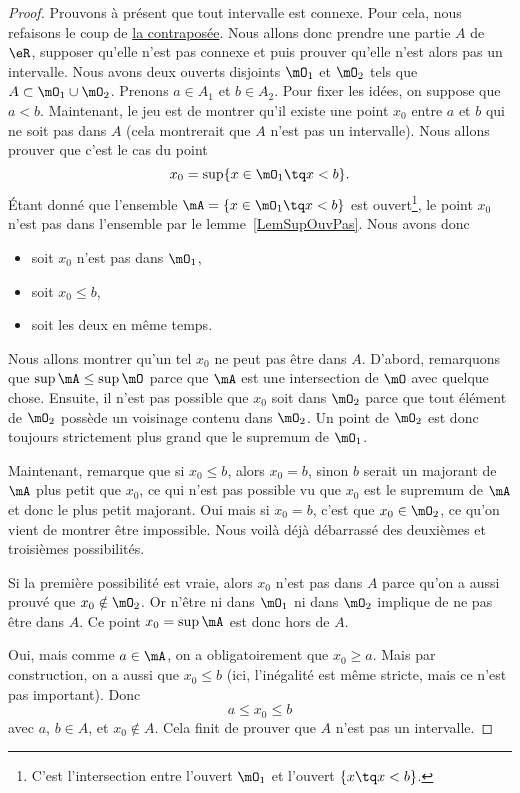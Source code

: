 \begin{proof}
    Prouvons à présent que tout intervalle est connexe. Pour cela, nous refaisons le coup de \href{http://fr.wikipedia.org/wiki/Contraposée}{la contraposée}. Nous allons donc prendre une partie $A$ de $\eR$, supposer qu'elle n'est pas connexe et puis prouver qu'elle n'est alors pas un intervalle. Nous avons deux ouverts disjoints $\mO_1$ et $\mO_2$ tels que $A\subset \mO_1\cup \mO_2$. Prenons $a\in A_1$ et $b\in A_2$. Pour fixer les idées, on suppose que $a<b$. Maintenant, le jeu est de montrer qu'il existe une point $x_0$ entre $a$ et $b$ qui ne soit pas dans $A$ (cela montrerait que $A$ n'est pas un intervalle). Nous allons prouver que c'est le cas du point
    \[
      x_0=\sup\{ x\in\mO_1\tq x<b \}.
    \]
    Étant donné que l'ensemble $\mA=\{ x\in\mO_1\tq x<b \}$ est ouvert\footnote{C'est l'intersection entre l'ouvert $\mO_1$ et l'ouvert $\{x\tq x<b \}$.}, le point $x_0$ n'est pas dans l'ensemble par le lemme~\ref{LemSupOuvPas}. Nous avons donc
    \begin{itemize}
        \item soit $x_0$ n'est pas dans $\mO_1$,
        \item soit $x_0\leq b$,
        \item soit les deux en même temps.
    \end{itemize}
    Nous allons montrer qu'un tel $x_0$ ne peut pas être dans $A$. D'abord, remarquons que $\sup\mA\leq\sup\mO$ parce que $\mA$ est une intersection de $\mO$ avec quelque chose. Ensuite, il n'est pas possible que $x_0$ soit dans $\mO_2$ parce que tout élément de $\mO_2$ possède un voisinage contenu dans $\mO_2$. Un point de $\mO_2$ est donc toujours strictement plus grand que le supremum de $\mO_1$.

    Maintenant, remarque que si $x_0\leq b$, alors $x_0=b$, sinon $b$ serait un majorant de $\mA$ plus petit que $x_0$, ce qui n'est pas possible vu que $x_0$ est le supremum de $\mA$ et donc le plus petit majorant. Oui mais si $x_0=b$, c'est que $x_0\in\mO_2$, ce qu'on vient de montrer être impossible. Nous voilà déjà débarrassé des deuxièmes et troisièmes possibilités.

    Si la première possibilité est vraie, alors $x_0$ n'est pas dans $A$ parce qu'on a aussi prouvé que $x_0\notin\mO_2$. Or n'être ni dans $\mO_1$ ni dans $\mO_2$ implique de ne pas être dans $A$. Ce point $x_0=\sup\mA$ est donc hors de $A$.

    Oui, mais comme $a\in\mA$, on a obligatoirement que $x_0\geq a$. Mais par construction, on a aussi que $x_0\leq b$ (ici, l'inégalité est même stricte, mais ce n'est pas important). Donc
    \[
      a\leq x_0\leq b
    \]
    avec $a$, $b\in A$, et $x_0\notin A$. Cela finit de prouver que $A$ n'est pas un intervalle.
\end{proof}

